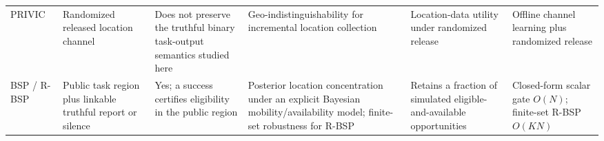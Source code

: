 \begin{tabular}{p{1.45cm}p{2.55cm}p{2.35cm}p{2.6cm}p{2.65cm}p{2.0cm}}
PRIVIC~\cite{privic2024} &
Randomized released location channel &
Does not preserve the truthful binary task-output semantics studied here &
Geo-indistinguishability for incremental location collection &
Location-data utility under randomized release &
Offline channel learning plus randomized release \\

BSP / R-BSP &
Public task region plus linkable truthful report or silence &
Yes; a success certifies eligibility in the public region &
Posterior location concentration under an explicit Bayesian mobility/availability model; finite-set robustness for R-BSP &
Retains a fraction of simulated eligible-and-available opportunities &
Closed-form scalar gate $O(N)$; finite-set R-BSP $O(KN)$ \\
\bottomrule
\end{tabular}
